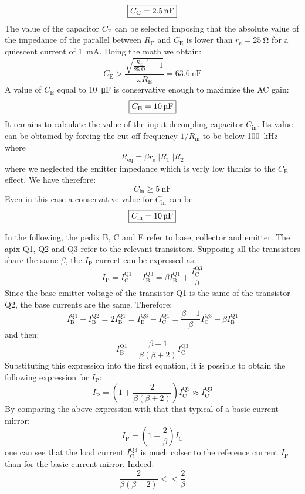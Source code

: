 \[\boxed{C_\text{C}=\SI{2.5}{\nano\farad}}\]
The value of the capacitor $C_\text{E}$ can be selected imposing that the absolute value of the impedance of the parallel between $R_\text{E}$ and $C_\text{E}$ is lower than $r_\text{e}=\SI{25}{\ohm}$ for a quiescent current of \SI{1}{\milli\ampere}.
Doing the math we obtain:
\[C_\text{E}>\frac{\sqrt{\frac{R_\text{E}}{\SI{25}{\ohm}}^2-1}}{\omega R_\text{E}}=\SI{63.6}{\nano\farad}\]
A value of $C_\text{E}$ equal to \SI{10}{\micro\farad} is conservative enough to maximise the AC gain:
\[\boxed{C_\text{E}=\SI{10}{\micro\farad}}\]
It remains to calculate the value of the input decoupling capacitor $C_\text{in}$. Its value can be obtained by forcing the cut-off frequency $1/R_\text{in}$ to be below \SI{100}{\kilo\hertz} where
\[R_\text{eq}=\beta r_\text{e} || R_1 || R_2\]
where we neglected the emitter impedance which is verly low thanks to the $C_\text{E}$ effect.
We have therefore:
\[C_\text{in} \geq \SI{5}{\nano\farad}\]
Even in this case a conservative value for $C_\text{in}$ can be:
\[\boxed{C_\text{in}=\SI{10}{\micro\farad}}\]

In the following, the pedix B, C and E refer to base, collector and emitter.
The apix Q1, Q2 and Q3 refer to the relevant transistors.
Supposing all the transistors share the same $\beta$, the $I_\text{P}$ currect can be expressed as:
\[I_\text{P}=I_\text{C}^\text{Q1}+I_\text{B}^\text{Q3}=\beta I_\text{B}^\text{Q1}+\frac{I_\text{C}^\text{Q3}}{\beta}\]
Since the base-emitter voltage of the transistor Q1 is the same of the transistor Q2, the base currents are the same. Therefore:
\[I_\text{B}^\text{Q1}+I_\text{B}^\text{Q2}=2I_\text{B}^\text{Q1}=I_\text{E}^\text{Q3}-I_\text{C}^\text{Q1}=\frac{\beta+1}{\beta}I_\text{C}^\text{Q3}-\beta I_\text{B}^\text{Q1}\]
and then:
\[I_\text{B}^\text{Q1}=\frac{\beta+1}{\beta(\beta+2)}I_\text{C}^\text{Q3}\]
Substituting this expression into the first equation, it is possible to obtain the following expression for $I_\text{P}$:
\[I_\text{P}=\left(1+\frac{2}{\beta(\beta+2)}\right)I_\text{C}^\text{Q3}\approx I_\text{C}^\text{Q3}\]
By comparing the above expression with that that typical of a basic current mirror:
\[I_\text{P}=\left(1+\frac{2}{\beta}\right) I_\text{C}\]
one can see that the load current $ I_\text{C}^\text{Q3}$ is much colser to the reference current $I_\text{P}$ than for the basic current mirror. Indeed:
\[\frac{2}{\beta(\beta+2)}<<\frac{2}{\beta}\]

